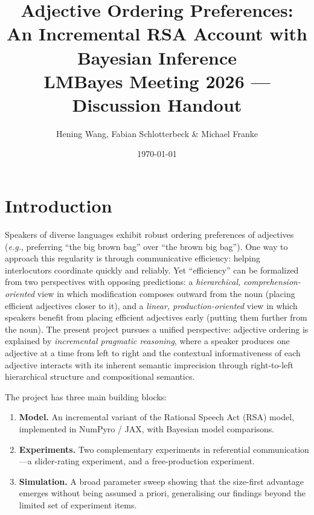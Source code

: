 \documentclass[11pt, a4paper]{article}
\title{
  \textbf{Adjective Ordering Preferences: \\
  An Incremental RSA Account with Bayesian Inference}\\[6pt]
  \large LMBayes Meeting 2026 --- Discussion Handout
}
\author{Hening Wang, Fabian Schlotterbeck \& Michael Franke}
\date{\today}
\newcommand{\eg}{\textit{e.g.}}
\begin{document}
\maketitle

\section*{Introduction}
\label{sec:intro}

Speakers of diverse languages exhibit robust ordering preferences of adjectives (\eg, preferring ``the big brown bag'' over ``the brown big bag'').
One way to approach this regularity is through communicative efficiency: helping interlocutors coordinate quickly and reliably.
Yet ``efficiency'' can be formalized from two perspectives with opposing predictions: a \emph{hierarchical, comprehension-oriented} view in which modification composes outward from the noun (placing efficient adjectives closer to it), and a \emph{linear, production-oriented} view in which speakers benefit from placing efficient adjectives early (putting them further from the noun).
The present project pursues a unified perspective: adjective ordering is explained by \emph{incremental pragmatic reasoning}, where a speaker produces one adjective at a time from left to right and the contextual informativeness of each adjective interacts with its inherent semantic imprecision through right-to-left hierarchical structure and compositional semantics.

The project has three main building blocks:
\begin{enumerate}[label=\arabic*.]
  \item \textbf{Model.} An incremental variant of the Rational Speech Act (RSA) model, implemented in NumPyro / JAX, with Bayesian model comparisons.
  \item \textbf{Experiments.} Two complementary experiments in referential communication---a slider-rating experiment, and a free-production experiment.
  \item \textbf{Simulation.} A broad parameter sweep showing that the size-first advantage emerges without being assumed a priori, generalising our findings beyond the limited set of experiment items.
\end{enumerate}
\end{document}
